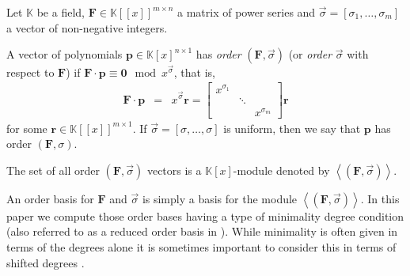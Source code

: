 Let $\mathbb{K}$ be a field, $\mathbf{F}\in\mathbb{K}\left[\left[x\right]\right]^{m\times n}$
a matrix of power series and $\vec{\sigma}=\left[\sigma_{1},\dots,\sigma_{m}\right]$
a vector of non-negative integers. 
\begin{defn}
A vector of polynomials $\mathbf{p}\in\mathbb{K}\left[x\right]^{n\times1}$
has \emph{order} $\left(\mathbf{F},\vec{\sigma}\right)$ (or \emph{order}
$\vec{\sigma}$ with respect to $\mathbf{F}$) if $\mathbf{F}\cdot\mathbf{p}\equiv\mathbf{0}\mod x^{\vec{\sigma}}$,
that is, \begin{eqnarray*}
\mathbf{F}\cdot\mathbf{p} & = & x^{\vec{\sigma}}\mathbf{r}=\begin{bmatrix}x^{\sigma_{1}}\\
 & \ddots\\
 &  & x^{\sigma_{m}}\end{bmatrix}\mathbf{r}\end{eqnarray*}
 for some $\mathbf{r}\in\mathbb{K}\left[\left[x\right]\right]^{m\times1}$.
If $\vec{\sigma}=\left[\sigma,\dots,\sigma\right]$ is uniform, then
we say that $\mathbf{p}$ has order $\left(\mathbf{F},\sigma\right).$
%
\begin{comment}
The vector of power series $\mathbf{r}$ is called the order $\left(\mathbf{F},\sigma\right)$-residual
of \textbf{$\mathbf{p}$}. 
\end{comment}
{} The set of all order $\left(\mathbf{F},\vec{\sigma}\right)$ vectors
is a $\mathbb{K}\left[x\right]$-module denoted by $\left\langle \left(\mathbf{F},\vec{\sigma}\right)\right\rangle $. 
\end{defn}
An order basis for $\mathbf{F}$ and $\vec{\sigma}$ is simply a basis
for the module $\left\langle \left(\mathbf{F},\vec{\sigma}\right)\right\rangle $.
In this paper we compute those order bases having a type of minimality
degree condition (also referred to as a reduced order basis in \citep{BL1997}).
While minimality is often given in terms of the degrees alone it is
sometimes important to consider this in terms of shifted degrees \citep{BLV:jsc06}.

